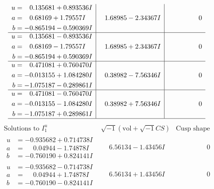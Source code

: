 \documentclass[1p]{elsarticle_modified}
\theoremstyle{definition}
\newcommand{\I}{\sqrt{-1}}
\begin{document}
$$\begin{array}{c|c|c}
\begin{aligned}
u &= \phantom{-}0.135681 + 0.893536 I \\
a &= \phantom{-}0.68169 + 1.79557 I \\
b &= -0.865194 - 0.590369 I\end{aligned}
 & \phantom{-}1.68985 - 2.34367 I & \phantom{-0.000000 } 0 \\ \hline\begin{aligned}
u &= \phantom{-}0.135681 - 0.893536 I \\
a &= \phantom{-}0.68169 - 1.79557 I \\
b &= -0.865194 + 0.590369 I\end{aligned}
 & \phantom{-}1.68985 + 2.34367 I & \phantom{-0.000000 } 0 \\ \hline\begin{aligned}
u &= \phantom{-}0.471081 + 0.760470 I \\
a &= -0.013155 + 1.084280 I \\
b &= -1.075187 - 0.289861 I\end{aligned}
 & \phantom{-}0.38982 - 7.56346 I & \phantom{-0.000000 } 0 \\ \hline\begin{aligned}
u &= \phantom{-}0.471081 - 0.760470 I \\
a &= -0.013155 - 1.084280 I \\
b &= -1.075187 + 0.289861 I\end{aligned}
 & \phantom{-}0.38982 + 7.56346 I & \phantom{-0.000000 } 0\\
 \hline 
 \end{array}$$\newpage$$\begin{array}{c|c|c}  
\text{Solutions to }I^u_{1}& \I (\text{vol} + \sqrt{-1}CS) & \text{Cusp shape}\\
 \hline 
\begin{aligned}
u &= -0.935682 + 0.714738 I \\
a &= \phantom{-}0.04944 - 1.74878 I \\
b &= -0.760190 + 0.824141 I\end{aligned}
 & \phantom{-}6.56134 - 1.43456 I & \phantom{-0.000000 } 0 \\ \hline\begin{aligned}
u &= -0.935682 - 0.714738 I \\
a &= \phantom{-}0.04944 + 1.74878 I \\
b &= -0.760190 - 0.824141 I\end{aligned}
 & \phantom{-}6.56134 + 1.43456 I & \phantom{-0.000000 } 0 \\ \hline\begin{aligned}

\end{aligned}
\end{array}$$
\end{document}
